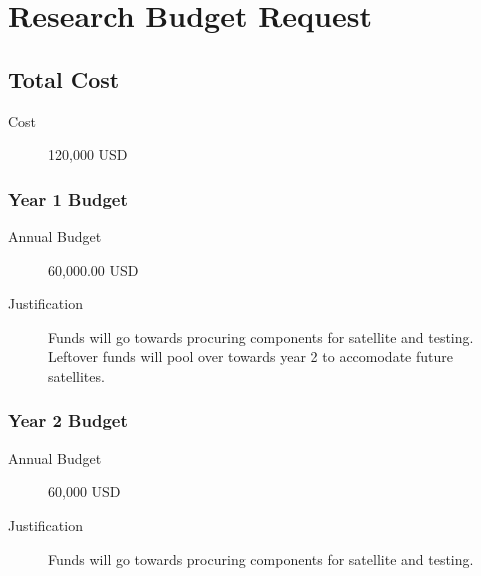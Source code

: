 \section{Research Budget Request}
\subsection{Total Cost}
\begin{description}
\item[Cost] 120,000 USD
\end{description}

\subsubsection{Year 1 Budget}
\begin{description}
\item[Annual Budget] 60,000.00 USD
\item[Justification] Funds will go towards procuring components for
  satellite and testing. Leftover funds will pool over towards year 2
  to accomodate future satellites.
\end{description}

\subsubsection{Year 2 Budget}
\begin{description}
\item[Annual Budget] 60,000 USD
\item[Justification] Funds will go towards procuring components for
  satellite and testing.
\end{description}
